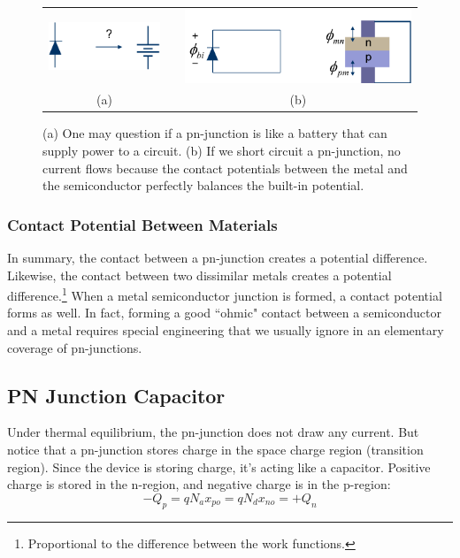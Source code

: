 \begin{figure}[tb]
\centering
\begin{tabular}{ccc}
\includegraphics[width=.3\columnwidth]{slide25} & \hspace{.5cm} &
\includegraphics[width=.45\columnwidth]{slide26}\\
(a) &  & (b)\\
\end{tabular}
\caption{(a) One may question if a pn-junction is like a battery that can supply power to a circuit.  (b) If we short circuit a pn-junction, no current flows because the contact potentials between the metal and the semiconductor perfectly balances the built-in potential. }
\label{fig:slide25_26}
\end{figure}
\subsubsection{Contact Potential Between Materials}
In summary, the contact between a pn-junction creates a potential difference.    Likewise, the contact between two dissimilar metals creates a potential difference.\footnote{Proportional to the difference between the work functions.}   When a metal semiconductor junction is formed, a contact potential forms as well.  In fact, forming a good ``ohmic" contact between a semiconductor and a metal requires special engineering that we usually ignore in an elementary coverage of pn-junctions.   
\subsection{PN Junction Capacitor}
Under thermal equilibrium, the pn-junction does not draw any current.   But notice that a pn-junction stores charge in the space charge region (transition region).   Since the device is storing charge, it's acting like a capacitor.    Positive charge is stored in the n-region, and negative charge is in the p-region:
    \begin{equation} 
        -Q_p = q{N_a}{x_{po}} = q{N_d}{x_{no}} = +Q_n
    \end{equation}
